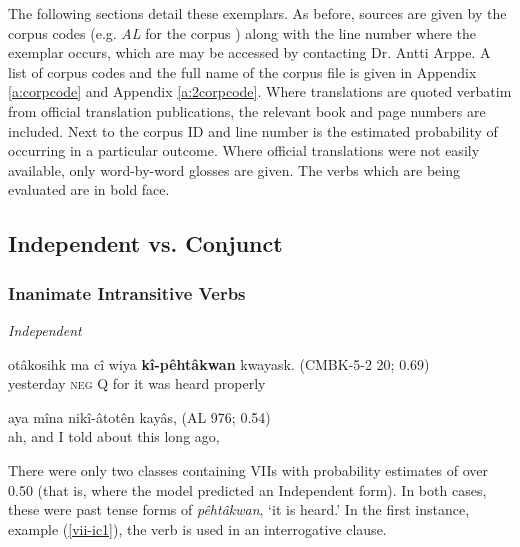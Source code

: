 The following sections detail these exemplars. As before, sources are given by the corpus codes (e.g. \textit{AL} for the corpus ) along with the line number where the exemplar occurs, which are may be accessed by contacting Dr. Antti Arppe. A list of corpus codes and the full name of the corpus file is given in Appendix \ref{a:corpcode} and Appendix \ref{a:2corpcode}. Where translations are quoted verbatim from official translation publications, the relevant book and page numbers are included. Next to the corpus ID and line number is the estimated probability of occurring in a particular outcome. Where official translations were not easily available, only word-by-word glosses are given. The verbs which are being evaluated are in bold face.

\subsection{Independent vs. Conjunct}

\subsubsection{Inanimate Intransitive Verbs}
\textit{Independent}
    \begin{exe}
    \ex
    \gll otâkosihk ma cî wiya \textbf{kî-pêhtâkwan} kwayask. \tiny{(CMBK-5-2 20; 0.69)}\\
         yesterday \textsc{neg} Q for {it was heard} properly \\
    \trans 
    \label{vii-ic1}
    \end{exe}
    
    \begin{exe}
    \ex
    \gll aya mîna nikî-âtotên kayâs, \tiny{(AL 976; 0.54)}\\
    ah, and {I told about this} {long ago},\\
    \label{vii-ic2}
    \end{exe}

There were only two classes containing VIIs with probability estimates of over 0.50 (that is, where the model predicted an Independent form). In both cases, these were past tense forms of \textit{pêhtâkwan}, `it is heard.' In the first instance, example (\ref{vii-ic1}), the verb is used in an interrogative clause.

